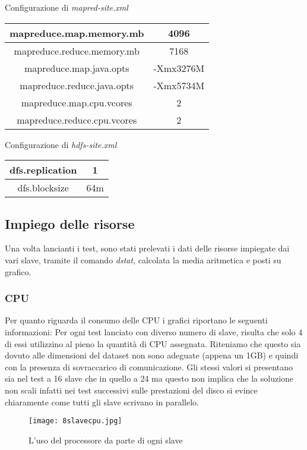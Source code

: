 \begin{center}
Configurazione di \textit{mapred-site.xml}\\
\begin{tabular}{ | c | c |} 
\hline
mapreduce.map.memory.mb & 4096 \\ 
\hline
mapreduce.reduce.memory.mb & 7168 \\ 
\hline
mapreduce.map.java.opts & -Xmx3276M \\
\hline
mapreduce.reduce.java.opts & -Xmx5734M \\ 
\hline
mapreduce.map.cpu.vcores & 2 \\
\hline
mapreduce.reduce.cpu.vcores & 2 \\
\hline
\end{tabular}
\end{center}

\begin{center}
Configurazione di \textit{hdfs-site.xml}\\
\begin{tabular}{ | c | c |} 
\hline
dfs.replication & 1 \\ 
\hline
dfs.blocksize & 64m \\ 
\hline
\end{tabular}
\end{center}
\subsection{Impiego delle risorse}
Una volta lancianti i test, sono stati prelevati i dati delle risorse impiegate dai vari slave, tramite il comando \textit{dstat}, calcolata la media aritmetica e posti su grafico.
\subsubsection{CPU}
Per quanto riguarda il consumo delle CPU i grafici riportano le seguenti informazioni: Per ogni test lanciato con diverso numero di slave, risulta che solo 4 di essi utilizzino al pieno la quantità di CPU assegnata. Riteniamo che questo sia dovuto alle dimensioni del dataset non sono adeguate (appena un 1GB) e quindi con la presenza di sovraccarico di comunicazione. Gli stessi valori si presentano sia nel test a 16 slave che in quello a 24 ma questo non implica che la soluzione non scali infatti nei test successivi sulle prestazioni del disco si evince chiaramente come tutti gli slave scrivano in parallelo.
\begin{figure}
  \begin{center}
    \texttt{[image: 8slavecpu.jpg]}
    \caption{L'uso del processore da parte di ogni slave}
    \label{fig:8slavecpu.jpg}
  \end{center}
\end{figure}


